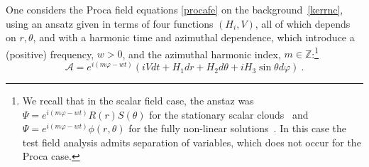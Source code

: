 One considers the Proca field equations \eqref{procafe} on the background~\eqref{kerrnc}, using an ansatz given in terms of four functions $(H_i,V)$, all of which depends on $r,\theta$, and with a harmonic time and azimuthal dependence, which introduce a (positive) frequency, $w>0$, and the azimuthal harmonic index, $m\in \mathbb{Z}$:\footnote{We recall that in the scalar field case, the anstaz was  
 $\Psi=e^{i(m\varphi-wt)}R(r)S(\theta)$ 
for the stationary scalar clouds~\cite{Hod:2012px,Benone:2014ssa} and 
 $\Psi=e^{i(m\varphi-wt)}\phi(r,\theta)$ 
for the fully non-linear solutions~\cite{Herdeiro:2014goa}. In this case the test field analysis admits separation of variables, which does not occur for the Proca case.}
%
\begin{equation}
\mathcal{A}=e^{i(m\varphi-w t)}\left(
 iV dt  +H_1dr+H_2d\theta+i H_3 \sin \theta d\varphi 
\right) \ .
\label{procaclouds}
\end{equation}

